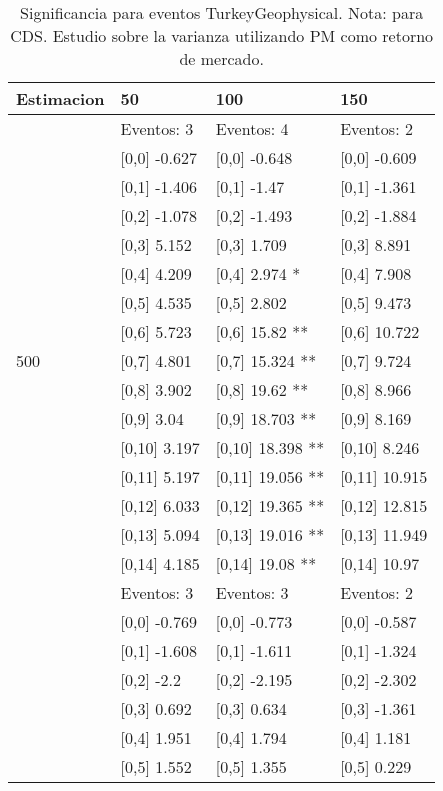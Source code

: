 \begin{table}

\caption{Significancia para eventos TurkeyGeophysical. Nota: para CDS. Estudio sobre la varianza utilizando PM como retorno de mercado.}
\centering
\begin{tabular}[t]{llll}
\toprule
Estimacion & 50 & 100 & 150\\
\midrule
 & Eventos:  3 & Eventos:  4 & Eventos:  2\\
 & {}[0,0] -0.627 & {}[0,0] -0.648 & {}[0,0] -0.609\\
 & {}[0,1] -1.406 & {}[0,1] -1.47 & {}[0,1] -1.361\\
 & {}[0,2] -1.078 & {}[0,2] -1.493 & {}[0,2] -1.884\\
 & {}[0,3] 5.152 & {}[0,3] 1.709 & {}[0,3] 8.891\\
\addlinespace
 & {}[0,4] 4.209 & {}[0,4] 2.974 * & {}[0,4] 7.908\\
 & {}[0,5] 4.535 & {}[0,5] 2.802 & {}[0,5] 9.473\\
 & {}[0,6] 5.723 & {}[0,6] 15.82 ** & {}[0,6] 10.722\\
500 & {}[0,7] 4.801 & {}[0,7] 15.324 ** & {}[0,7] 9.724\\
 & {}[0,8] 3.902 & {}[0,8] 19.62 ** & {}[0,8] 8.966\\
\addlinespace
 & {}[0,9] 3.04 & {}[0,9] 18.703 ** & {}[0,9] 8.169\\
 & {}[0,10] 3.197 & {}[0,10] 18.398 ** & {}[0,10] 8.246\\
 & {}[0,11] 5.197 & {}[0,11] 19.056 ** & {}[0,11] 10.915\\
 & {}[0,12] 6.033 & {}[0,12] 19.365 ** & {}[0,12] 12.815\\
 & {}[0,13] 5.094 & {}[0,13] 19.016 ** & {}[0,13] 11.949\\
\addlinespace
 & {}[0,14] 4.185 & {}[0,14] 19.08 ** & {}[0,14] 10.97\\
 & Eventos:  3 & Eventos:  3 & Eventos:  2\\
 & {}[0,0] -0.769 & {}[0,0] -0.773 & {}[0,0] -0.587\\
 & {}[0,1] -1.608 & {}[0,1] -1.611 & {}[0,1] -1.324\\
 & {}[0,2] -2.2 & {}[0,2] -2.195 & {}[0,2] -2.302\\
\addlinespace
 & {}[0,3] 0.692 & {}[0,3] 0.634 & {}[0,3] -1.361\\
 & {}[0,4] 1.951 & {}[0,4] 1.794 & {}[0,4] 1.181\\
 & {}[0,5] 1.552 & {}[0,5] 1.355 & {}[0,5] 0.229\\

\end{tabular}
\end{table}
